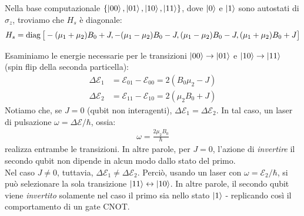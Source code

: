 \documentclass[../../InformazioneQuantistica.tex]{subfiles}
\begin{document}
Nella base computazionale $\{\Ket{00}, \Ket{01}, \Ket{10}, \Ket{11}\}$, dove $\Ket{0}$ e $\Ket{1}$ sono autostati di $\sigma_z$, troviamo che $H_s$ è diagonale:
\begin{align*}
    H_s = \operatorname{diag} \big[ -(\mu_1 + \mu_2) B_0 + J, -(\mu_1-\mu_2)B_0 - J, (\mu_1 - \mu_2) B_0 - J, (\mu_1+\mu_2)B_0 + J \big]
\end{align*}

Esaminiamo le energie necessarie per le transizioni $\Ket{00} \to \Ket{01}$ e $\Ket{10} \to \Ket{11}$ (spin flip della seconda particella):
\begin{align*}
    \Delta\mathcal{E}_1 &= \mathcal{E}_{01}- \mathcal{E}_{00} = 2(B_0 \mu_2 - J)\\
    \Delta\mathcal{E}_2 &= \mathcal{E}_{11}-\mathcal{E}_{10} = 2(\mu_2 B_0 + J)
\end{align*}
Notiamo che, se $J = 0$ (qubit non interagenti), $\Delta \mathcal{E}_1 = \Delta \mathcal{E}_2$. In tal caso, un laser di pulsazione $\omega = \Delta \mathcal{E}/\hbar$, ossia:
\begin{align*}
    \omega = \frac{2\mu_2 B_0}{\hbar}
\end{align*}
realizza entrambe le transizioni. In altre parole, per $J=0$, l'azione di \textit{invertire} il secondo qubit non dipende in alcun modo dallo stato del primo.\\
Nel caso $J\neq 0$, tuttavia, $\Delta \mathcal{E}_1 \neq \Delta \mathcal{E}_2$. Perciò, usando un laser con $\omega = \mathcal{E}_2/\hbar$, si può selezionare la sola transizione $\Ket{11} \leftrightarrow \Ket{10}$. In altre parole, il secondo qubit viene \textit{invertito} solamente nel caso il primo sia nello stato $\Ket{1}$ - replicando così il comportamento di un gate CNOT.
\end{document}

